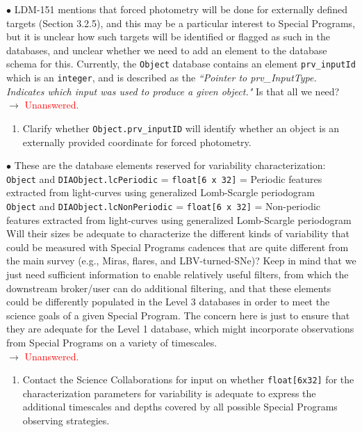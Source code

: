 \documentclass[DM,lsstdraft,toc]{lsstdoc}
\begin{document}
$\bullet$ LDM-151 mentions that forced photometry will be done for externally defined targets (Section 3.2.5), and this may be a particular interest to Special Programs, but it is unclear how such targets will be identified or flagged as such in the databases, and unclear whether we need to add an element to the database schema for this. Currently, the {\tt Object} database contains an element {\tt prv\_inputId} which is an {\tt integer}, and is described as the {\it ``Pointer to prv\_InputType. Indicates which input was used to produce a given object."} Is that all we need? \\
$\rightarrow$ \textcolor{red}{Unanswered.}
\begin{enumerate}[resume,topsep=-10pt,label= \textbf{Concern \Roman*.}] \item \label{C9} Clarify whether {\tt Object.prv\_inputID} will identify whether an object is an externally provided coordinate for forced photometry. \end{enumerate}

$\bullet$ These are the database elements reserved for variability characterization: \\
{\tt Object} and {\tt DIAObject.lcPeriodic} = {\tt float[6 x 32]} = Periodic features extracted from light-curves using generalized Lomb-Scargle periodogram \\
{\tt Object} and {\tt DIAObject.lcNonPeriodic} = {\tt float[6 x 32]} = Non-periodic features extracted from light-curves using generalized Lomb-Scargle periodogram \\
Will their sizes be adequate to characterize the different kinds of variability that could be measured with Special Programs cadences that are quite different from the main survey (e.g., Miras, flares, and LBV-turned-SNe)? Keep in mind that we just need sufficient information to enable relatively useful filters, from which the downstream broker/user can do additional filtering, and that these elements could be differently populated in the Level 3 databases in order to meet the science goals of a given Special Program. The concern here is just to ensure that they are adequate for the Level 1 database, which might incorporate observations from Special Programs on a variety of timescales. \\
$\rightarrow$ \textcolor{red}{Unanswered.}
\begin{enumerate}[resume,topsep=-10pt,label= \textbf{Concern \Roman*.}] \item \label{C10} Contact the Science Collaborations for input on whether {\tt float[6x32]} for the characterization parameters for variability is adequate to express the additional timescales and depths covered by all possible Special Programs observing strategies. \end{enumerate}
\end{document}
